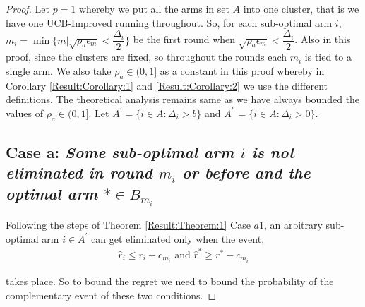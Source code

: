 \begin{proof}

Let $p=1$ whereby we put all the arms in set $A$ into one cluster, that is we have one UCB-Improved running throughout. So, for each sub-optimal arm ${i}$, $m_{i}=\min{\lbrace m|\sqrt{\rho_{a}\epsilon_{m}} < \dfrac{\Delta_{i}}{2} \rbrace}$ be the first round when $\sqrt{\rho_{a}\epsilon_{m}} < \dfrac{\Delta_{i}}{2}$. Also in this proof, since the clusters are fixed, so throughout the rounds each $m_{i}$ is tied to a single arm. We also take $\rho_{a}\in (0,1]$ as a constant in this proof whereby in Corollary \ref{Result:Corollary:1} and \ref{Result:Corollary:2} we use the different definitions. The theoretical analysis remains same as we have always bounded the values of $\rho_{a}\in (0,1]$. Let $A^{'}=\lbrace i\in A: \Delta_{i} > b \rbrace$ and $A^{''}=\lbrace i\in A: \Delta_{i} > 0 \rbrace$.


\subsection*{Case a: \textit{Some sub-optimal arm ${i}$ is not eliminated in round $m_{i}$ or before and the optimal arm ${*}\in B_{m_{i}}$}}

  
	Following the steps of Theorem \ref{Result:Theorem:1} Case $a1$, an arbitrary sub-optimal arm ${i}\in A^{'}$ can get eliminated only when the event,
	\begin{align}
	\hat{r}_{i}  \le r_{i} + c_{m_{i}} \text{ and } \label{eq:appA:armelim-casea}
 	\hat{r}^{*}\geq  r^{*} - c_{m_{i}}
	\end{align}
	
	takes place. So to bound the regret we need to bound the probability of the complementary event of these two conditions.
  

\end{proof}
